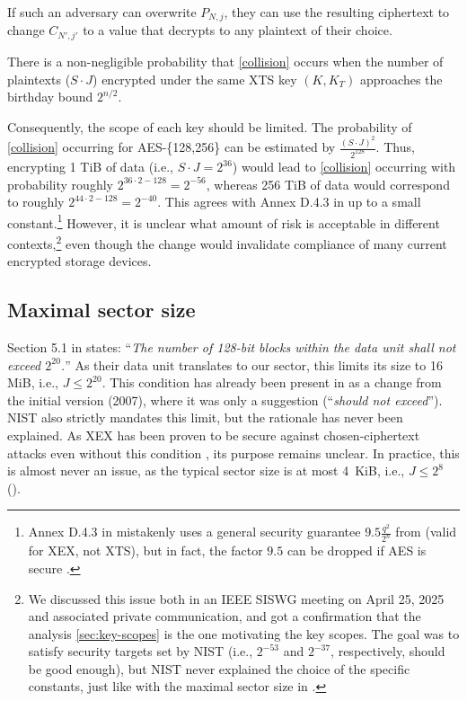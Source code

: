 \documentclass[a4paper]{article}
\begin{document}
If such an adversary can overwrite $P_{N,j}$, they can use the resulting ciphertext to change $C_{N',j'}$ to a value that decrypts to any plaintext of their choice.

There is a non-negligible probability that \eqref{collision} occurs when the number of plaintexts ($S\cdot J$) encrypted under the same XTS key $(K, K_T)$ approaches the birthday bound $2^{n/2}$.

\clearpage
Consequently, the scope of each key should be limited. The probability of \eqref{collision} occurring for AES-\{128,256\} can be estimated by $\frac{(S\cdot J)^2}{2^{128}}$. Thus, encrypting 1 TiB of data (i.e., $S\cdot J=2^{36}$) would lead to \eqref{collision} occurring with probability roughly $2^{36\cdot 2-128}=2^{-56}$, whereas 256 TiB of data would correspond to roughly $2^{44\cdot 2-128}=2^{-40}$. This agrees with Annex D.4.3 in \cite{IEEE1619-2018} up to a small constant.\footnote{
Annex D.4.3 in \cite{IEEE1619-2018} mistakenly uses a general security guarantee $9.5 \frac{q^2}{2^n}$ from \cite{rogaway2004efficient} (valid for XEX, not XTS), but in fact, the factor $9.5$ can be dropped if AES is secure \cite{liskov2008comments,ball2012xts}.
}
However, it is unclear what amount of risk is acceptable in different contexts,\footnote{We discussed this issue both in an IEEE SISWG meeting on April 25, 2025 and associated private communication, and got a confirmation that the analysis \ref{sec:key-scopes} is the one motivating the key scopes. The goal was to satisfy
security targets set by NIST (i.e., $2^{-53}$ and $2^{-37}$, respectively, should be good enough), but NIST never explained the choice of the specific constants, just like with the maximal sector size in .} even though the change would invalidate compliance of many current  encrypted storage devices.

\subsection{Maximal sector size}\label{sec:maxsectorsize}
Section 5.1 in \cite{IEEE1619-2018} states: ``\emph{The number of 128-bit blocks within the data unit shall not exceed $2^{20}$.}'' As their data unit translates to our sector, this limits its size to 16 MiB, i.e., $J \le 2^{20}$. This condition has already been present in \cite{IEEE1619-2018} as a change from the initial version (2007), where it was only a suggestion (``\emph{should not exceed}''). NIST \cite{nistxts} also strictly mandates this limit, but the rationale has never been explained. As XEX has been proven to be secure against chosen-ciphertext attacks even without this condition \cite{rogaway2004efficient,minematsu2006improved}, its purpose remains unclear.
In practice, this is almost never an issue, as the typical sector size is at most 4~KiB, i.e., $J \le 2^8$ ().
\end{document}
